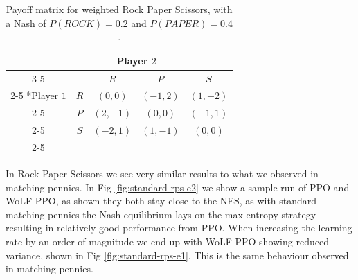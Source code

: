 \documentclass[conference]{IEEEtran}
\begin{document}

\begin{table}[!ht]
    \centering
    \setlength{\extrarowheight}{2pt}
    \begin{tabular}{*{5}{c|}}
      \multicolumn{2}{c}{} & \multicolumn{2}{c}{Player $2$}\\\cline{3-5}
      \multicolumn{1}{c}{} &  & $R$  & $P$ & $S$ \\\cline{2-5}
      \multirow{2}*{Player $1$}  & $R$ & $(0,0)$ & $(-1,2)$ & $(1,-2)$ \\\cline{2-5}
      & $P$ & $(2,-1)$ & $(0,0)$ & $(-1,1)$ \\\cline{2-5}
      & $S$ & $(-2,1)$ & $(1,-1)$ & $(0,0)$ \\\cline{2-5}
    \end{tabular}
    \caption{Payoff matrix for weighted Rock Paper Scissors, with a Nash of $P(ROCK)=0.2$ and $P(PAPER)=0.4$.}
    \label{tab:weighted-rps}
\end{table}

In Rock Paper Scissors we see very similar results to what we observed in matching pennies. In Fig \ref{fig:standard-rps-e2} we show a sample run of PPO and WoLF-PPO, as shown they both stay close to the NES, as with standard matching pennies the Nash equilibrium lays on the max entropy strategy resulting in relatively good performance from PPO. When increasing the learning rate by an order of magnitude we end up with WoLF-PPO showing reduced variance, shown in Fig \ref{fig:standard-rps-e1}. This is the same behaviour observed in matching pennies.
\end{document}
